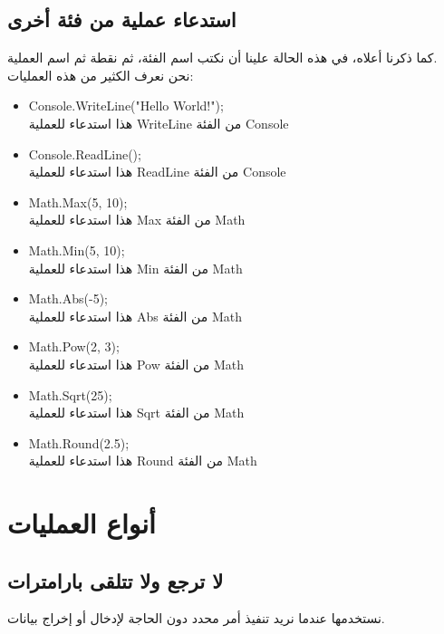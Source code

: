 \documentclass[12pt]{article}
\begin{document}
\subsection*{استدعاء عملية من فئة أخرى}
كما ذكرنا أعلاه، في هذه الحالة علينا أن نكتب اسم الفئة، ثم نقطة ثم اسم العملية. \\
نحن نعرف الكثير من هذه العمليات:
\begin{itemize}
    \item \textenglish{Console.WriteLine("Hello World!");} \\
    هذا استدعاء للعملية \textenglish{WriteLine} من الفئة \textenglish{Console}
    \item \textenglish{Console.ReadLine();} \\
    هذا استدعاء للعملية \textenglish{ReadLine} من الفئة \textenglish{Console}
    \item \textenglish{Math.Max(5, 10);} \\
    هذا استدعاء للعملية \textenglish{Max} من الفئة \textenglish{Math}
    \item \textenglish{Math.Min(5, 10);} \\
    هذا استدعاء للعملية \textenglish{Min} من الفئة \textenglish{Math}
    \item \textenglish{Math.Abs(-5); } \\
    هذا استدعاء للعملية \textenglish{Abs} من الفئة \textenglish{Math}
    \item \textenglish{Math.Pow(2, 3); } \\
    هذا استدعاء للعملية \textenglish{Pow} من الفئة \textenglish{Math}
    \item \textenglish{Math.Sqrt(25); } \\
    هذا استدعاء للعملية \textenglish{Sqrt} من الفئة \textenglish{Math}
    \item \textenglish{Math.Round(2.5); } \\
    هذا استدعاء للعملية \textenglish{Round} من الفئة \textenglish{Math}
\end{itemize}

\clearpage
\section{أنواع العمليات}

\subsection{لا ترجع ولا تتلقى بارامترات}
نستخدمها عندما نريد تنفيذ أمر محدد دون الحاجة لإدخال أو إخراج بيانات.
\end{document}
